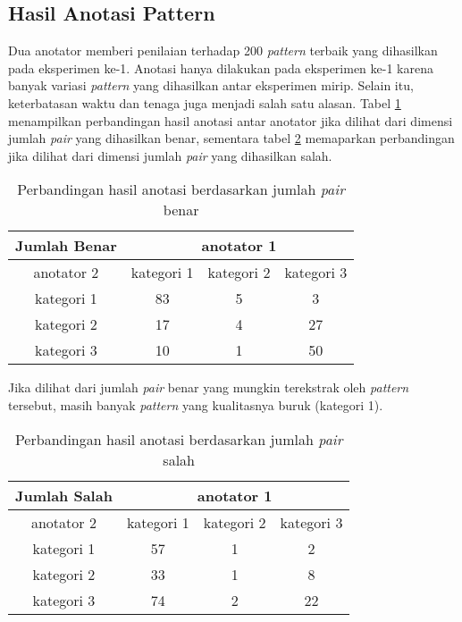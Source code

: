\subsection{Hasil Anotasi Pattern}
Dua anotator memberi penilaian terhadap 200 \textit{pattern} terbaik yang dihasilkan pada eksperimen ke-1. Anotasi hanya dilakukan pada eksperimen ke-1 karena banyak variasi \textit{pattern} yang dihasilkan antar eksperimen mirip. Selain itu, keterbatasan waktu dan tenaga juga menjadi salah satu alasan. Tabel \ref{table:p-anotasi-benar} menampilkan perbandingan hasil anotasi antar anotator jika dilihat dari dimensi jumlah \textit{pair} yang dihasilkan benar, sementara tabel \ref{table:p-anotasi-salah} memaparkan perbandingan jika dilihat dari dimensi jumlah \textit{pair} yang dihasilkan salah.

\begin{table}
  \centering
  \caption{Perbandingan hasil anotasi berdasarkan jumlah \textit{pair} benar}
  \label{table:p-anotasi-benar}
  \begin{tabular}{|c|c|c|c|}
  \hline
  Jumlah Benar & \multicolumn{3}{c|}{ anotator 1 } \\ \hline
  anotator 2 & kategori 1 & kategori 2 & kategori 3 \\ \hline
  kategori 1 & 83 & 5 & 3 \\ \hline
  kategori 2 & 17 & 4 & 27 \\ \hline
  kategori 3 & 10 & 1 & 50 \\ \hline
  \end{tabular} 
\end{table}

\noindent Jika dilihat dari jumlah \textit{pair} benar yang mungkin terekstrak oleh \textit{pattern} tersebut, masih banyak \textit{pattern} yang kualitasnya buruk (kategori 1).

\begin{table}
  \centering
  \caption{Perbandingan hasil anotasi berdasarkan jumlah \textit{pair} salah}
  \label{table:p-anotasi-salah}
  \begin{tabular}{|c|c|c|c|}
  \hline
  Jumlah Salah & \multicolumn{3}{c|}{ anotator 1 } \\ \hline
  anotator 2 & kategori 1 & kategori 2 & kategori 3 \\ \hline
  kategori 1 & 57 & 1 & 2 \\ \hline
  kategori 2 & 33 & 1 & 8 \\ \hline
  kategori 3 & 74 & 2 & 22 \\ \hline
  \end{tabular} 
\end{table}

